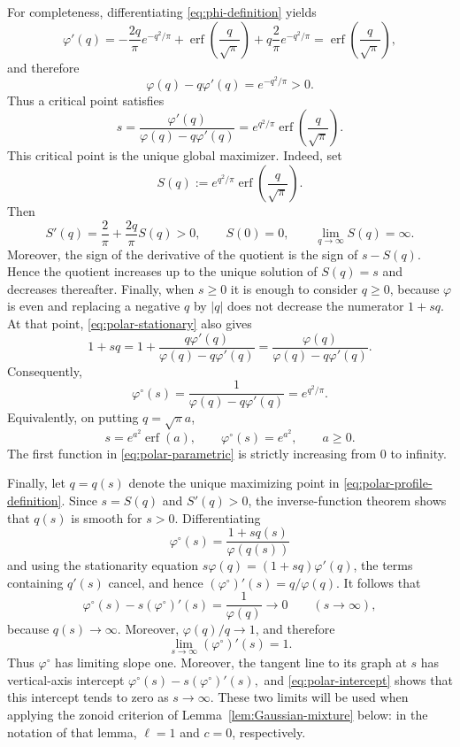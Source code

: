 \documentclass[11pt]{article}
\theoremstyle{definition}
\theoremstyle{remark}
\newcommand{\abs}[1]{\left|#1\right|}
\newcommand{\erf}{\operatorname{erf}}
\begin{document}
For completeness, differentiating \eqref{eq:phi-definition} yields
$$
 \varphi'(q)
 =-\frac{2q}{\pi}e^{-q^2/\pi}
   +\erf\!\left(\frac q{\sqrt\pi}\right)
   +q\frac{2}{\pi}e^{-q^2/\pi}=\erf\!\left(\frac q{\sqrt\pi}\right),
$$
and therefore
\[
 \varphi(q)-q\varphi'(q)=e^{-q^2/\pi}>0.
\]
Thus a critical point satisfies
\begin{equation}\label{eq:polar-stationary}
 s=\frac{\varphi'(q)}{\varphi(q)-q\varphi'(q)}
 =e^{q^2/\pi}\erf\!\left(\frac q{\sqrt\pi}\right).
\end{equation}
This critical point is the unique global maximizer.  Indeed, set
\[
 S(q):=e^{q^2/\pi}\erf\!\left(\frac q{\sqrt\pi}\right).
\]
Then
\[
 S'(q)=\frac2\pi+\frac{2q}{\pi}S(q)>0,
 \qquad S(0)=0,
 \qquad \lim_{q\to\infty}S(q)=\infty.
\]
Moreover, the sign of the derivative of the quotient is the sign of
$s-S(q)$.  Hence the quotient increases up to the unique solution of
$S(q)=s$ and decreases thereafter.  Finally, when $s\geq0$ it is
enough to consider $q\geq0$, because $\varphi$ is even and replacing a
negative $q$ by $\abs q$ does not decrease the numerator $1+sq$.
At that point, \eqref{eq:polar-stationary} also gives
\[
 1+sq
 =1+\frac{q\varphi'(q)}{\varphi(q)-q\varphi'(q)}
 =\frac{\varphi(q)}{\varphi(q)-q\varphi'(q)}.
\]
Consequently,
\begin{equation}\label{eq:polar-profile-value}
 \varphi^\circ(s)
 =\frac1{\varphi(q)-q\varphi'(q)}
 =e^{q^2/\pi}.
\end{equation}
Equivalently, on putting $q=\sqrt\pi a$,
\begin{equation}\label{eq:polar-parametric}
 s=e^{a^2}\erf(a),
 \qquad
 \varphi^\circ(s)=e^{a^2},
 \qquad a\geq0.
\end{equation}
The first function in \eqref{eq:polar-parametric} is strictly
increasing from $0$ to infinity.

Finally, let $q=q(s)$ denote the unique maximizing point in
 \eqref{eq:polar-profile-definition}.  Since $s=S(q)$ and $S'(q)>0$,
the inverse-function theorem shows that $q(s)$ is smooth for $s>0$.
Differentiating
\[
 \varphi^\circ(s)=\frac{1+sq(s)}{\varphi(q(s))}
\]
and using the stationarity equation
$s\varphi(q)=(1+sq)\varphi'(q)$, the terms containing $q'(s)$ cancel,
and hence $(\varphi^\circ)'(s)=q/\varphi(q)$.  It follows that
\begin{equation}\label{eq:polar-intercept}
 \varphi^\circ(s)-s(\varphi^\circ)'(s)
 =\frac1{\varphi(q)}\longrightarrow0
 \qquad(s\to\infty),
\end{equation}
because $q(s)\to\infty$.  Moreover,
$\varphi(q)/q\to1$, and therefore
\begin{equation}\label{sloplimit}
\lim_{s\to\infty}(\varphi^\circ)'(s)=1.
\end{equation}
Thus $\varphi^\circ$ has limiting slope one.  Moreover, the tangent
line to its graph at $s$ has vertical-axis intercept
$
 \varphi^\circ(s)-s(\varphi^\circ)'(s),$
and \eqref{eq:polar-intercept} shows that this intercept tends to zero as
$s\to\infty$. These two limits
will be used when applying the zonoid criterion of
Lemma~\ref{lem:Gaussian-mixture} below: in the notation of that lemma,
$\ell=1$ and $c=0$, respectively.
\end{document}

